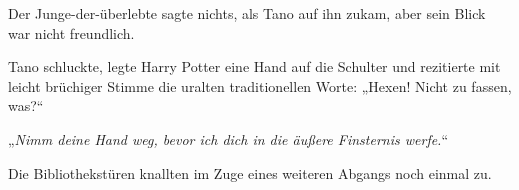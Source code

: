 Der Junge-der-überlebte sagte nichts, als Tano auf ihn zukam, aber sein Blick war nicht freundlich.

Tano schluckte, legte Harry Potter eine Hand auf die Schulter und rezitierte mit leicht brüchiger Stimme die uralten traditionellen Worte:
„Hexen! Nicht zu fassen, was?“

„\emph{Nimm deine Hand weg, bevor ich dich in die äußere Finsternis werfe.}“

Die Bibliothekstüren knallten im Zuge eines weiteren Abgangs noch einmal zu.

